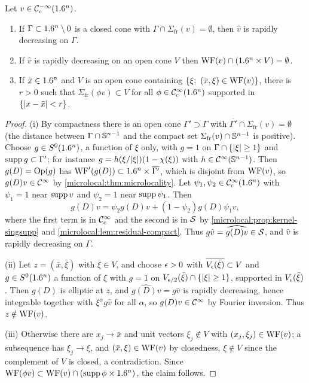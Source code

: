 \begin{lemma}\label{microlocal:lem:fourier-global}
  Let $v\in\mathcal{C}^{-\infty}_{\mathrm{c}}(1.6^n)$.
  \begin{enumerate}[label=\textup{(\roman*)}]
  \item If $\Gamma\subset1.6^n\setminus0$ is a closed cone with
    $\Gamma\cap\Sigma_{\mathrm{fr}}(v)=\emptyset$, then $\hat v$ is rapidly decreasing on
    $\Gamma$.
  \item If $\hat v$ is rapidly decreasing on an open cone $V$ then
    $\operatorname{WF}(v)\cap(1.6^n\times V)=\emptyset$.
  \item If $\bar x\in1.6^n$ and $V$ is an open cone containing
    $\{\xi;\ (\bar x,\xi)\in\operatorname{WF}(v)\}$, there is $r>0$ such that
    $\Sigma_{\mathrm{fr}}(\phi v)\subset V$ for all $\phi\in\mathcal{C}^\infty_{\mathrm{c}}(1.6^n)$ supported in
    $\{\lvert x-\bar x\rvert<r\}$.
  \end{enumerate}
\end{lemma}
\begin{proof}
  (i) By compactness there is an open cone $\Gamma'\supset\Gamma$ with
  $\overline{\Gamma'}\cap\Sigma_{\mathrm{fr}}(v)=\emptyset$ (the distance between
  $\Gamma\cap\mathbb{S}^{n-1}$ and the compact set $\Sigma_{\mathrm{fr}}(v)\cap\mathbb{S}^{n-1}$ is
  positive). Choose $g\in S^0(1.6^n)$, a function of $\xi$ only, with $g=1$ on
  $\Gamma\cap\{\lvert \xi\rvert\ge1\}$ and $\operatorname{supp} g\subset\Gamma'$; for instance $g=
  h(\xi/\lvert \xi\rvert)(1-\chi(\xi))$ with $h\in\mathcal{C}^\infty(\mathbb{S}^{n-1})$. Then
  $g(D)=\operatorname{Op}(g)$ has $\operatorname{WF}'(g(D))\subset1.6^n\times\overline{\Gamma'}$, which is
  disjoint from $\operatorname{WF}(v)$, so $g(D)v\in\mathcal{C}^\infty$ by
  \cref{microlocal:thm:microlocality}. Let $\psi_1,\psi_2\in\mathcal{C}^\infty_{\mathrm{c}}(1.6^n)$ with
  $\psi_1=1$ near $\operatorname{supp} v$ and $\psi_2=1$ near $\operatorname{supp}\psi_1$. Then
  \begin{equation*}
    g(D)v=\psi_2g(D)v+(1-\psi_2)g(D)\psi_1v,
  \end{equation*}
  where the first term is in $\mathcal{C}^\infty_{\mathrm{c}}$ and the second is in $\mathcal{S}$ by
  \cref{microlocal:prop:kernel-singsupp} and
  \cref{microlocal:lem:residual-compact}. Thus $g\hat v=\widehat{g(D)v}\in\mathcal{S}$,
  and $\hat v$ is rapidly decreasing on $\Gamma$.

  (ii) Let $z=(\bar x,\bar\xi)$ with $\bar\xi\in V$, and choose $\epsilon>0$ with
  $\overline{V_\epsilon(\bar\xi)}\subset V$ and $g\in S^0(1.6^n)$ a function of
  $\xi$ with $g=1$ on $V_{\epsilon/2}(\bar\xi)\cap\{\lvert \xi\rvert\ge1\}$, supported in
  $V_\epsilon(\bar\xi)$. Then $g(D)$ is elliptic at $z$, and
  $\widehat{g(D)v}=g\hat v$ is rapidly decreasing, hence integrable together
  with $\xi^\alpha g\hat v$ for all $\alpha$, so $g(D)v\in\mathcal{C}^\infty$ by Fourier
  inversion. Thus $z\notin\operatorname{WF}(v)$.

  (iii) Otherwise there are $x_j\to\bar x$ and unit vectors $\xi_j\notin V$
  with $(x_j,\xi_j)\in\operatorname{WF}(v)$; a subsequence has $\xi_j\to\xi$, and
  $(\bar x,\xi)\in\operatorname{WF}(v)$ by closedness, $\xi\notin V$ since the complement of
  $V$ is closed, a contradiction. Since $\operatorname{WF}(\phi v)\subset\operatorname{WF}(v)\cap
  (\operatorname{supp}\phi\times1.6^n)$, the claim follows.
\end{proof}


